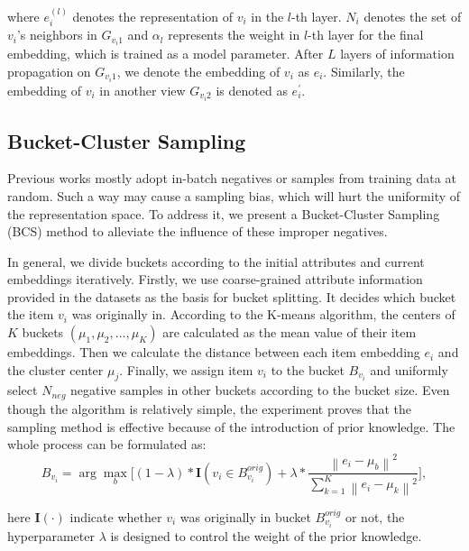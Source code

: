 \documentclass[runningheads]{llncs}
\begin{document}
where $e_{i}^{(l)}$ denotes the representation of $v_i$ in the $l$-th layer. $N_i$ denotes the set of $v_i$'s neighbors in $G_{v_{i}1}$ and $\alpha_l$ represents the weight in $l$-th layer for the final embedding, which is trained as a model parameter. After $L$ layers of information propagation on  $G_{v_i1}$, we denote the embedding of $v_i$ as $e_i$. Similarly, the embedding of $v_i$ in another view $G_{v_i2}$ is denoted as $e_i^{\prime}$. 
\vspace{-10pt}
\subsection{Bucket-Cluster Sampling}
\vspace{-2pt}
Previous works \cite{cl4rec,s3rec} mostly adopt in-batch negatives or samples from training data at random. Such a way may cause a sampling bias, which will hurt the uniformity of the representation space. To address it, we present a Bucket-Cluster Sampling (BCS) method to alleviate the influence of these improper negatives.

In general, we divide buckets according to the initial attributes and current embeddings iteratively. 
Firstly, we use coarse-grained attribute information provided in the datasets as the basis for bucket splitting. It decides which bucket the item \( v_i \) was originally in. According to the K-means algorithm, the centers of $K$ buckets $(\mu_{1}, \mu_{2}, \ldots, \mu_{K})$ are calculated as the mean value of their item embeddings. Then we calculate the distance between each item embedding $e_i$ and the cluster center $\mu_j$.  Finally, we assign item $v_i$ to the bucket $B_{v_i}$ and uniformly select $N_{neg}$ negative samples in other buckets according to the bucket size. Even though the algorithm is relatively simple, the experiment proves that the sampling method is effective because of the introduction of prior knowledge. The whole process can be formulated as:
\vspace{-5pt}
\begin{equation}
B_{v_i} = \arg\max_{b}\big[(1-\lambda)*\textbf{I}(v_{i} \in B^{orig}_{v_i}) + \lambda*\frac{\left\|e_{i}-\mu_{b}\right\|^{2}}{\sum_{k=1}^{K} \left\|e_{i}-\mu_{k}\right\|^{2}}\big],
\end{equation}
\vspace{-5pt}

here $\textbf{I}(\cdot)$ indicate whether $v_i$ was originally in bucket $B_{v_i}^{orig}$ or not, the hyperparameter $\lambda$ is designed to control the weight of the prior knowledge.
\end{document}
